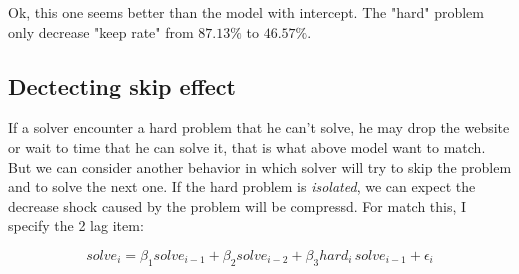 \documentclass{article}
\begin{document}
Ok, this one seems better than the model with intercept. The "hard" problem only decrease "keep rate" 
from $87.13\%$ to $46.57\%$.

\subsection{Dectecting skip effect}

If a solver encounter a hard problem that he can't solve, he may drop the website or wait to time that he can
solve it, that is what above model want to match. But we can consider another behavior in which solver will
try to skip the problem and to solve the next one. If the hard problem is \textit{isolated}, we can expect
the decrease shock caused by the problem will be compressd. For match this, I specify the 2 lag item:

\[
solve_i = \beta_1 solve_{i-1} + \beta_2 solve_{i-2} + \beta_3 hard_i \, solve_{i-1} + \epsilon_i
\]
\end{document}
